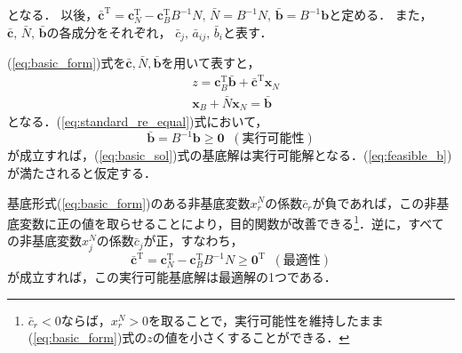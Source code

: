 \documentclass{jsreport}
\begin{document}
となる．
以後，$\bar{\bm{c}}^{\mathrm{T}} = \bm{c}_N^{\mathrm{T}} - \bm{c}_B^{\mathrm{T}}B^{-1}N, \, \bar{N} = B^{-1}N, \, \bar{\bm{b}} = B^{-1}\bm{b}$と定める．
また，$\bar{\bm{c}}, \, \bar{N}, \, \bar{\bm{b}}$の各成分をそれぞれ，
$\bar{c}_{j}, \, \bar{a}_{ij}, \, \bar{b}_i$と表す．

(\ref{eq:basic_form})式を$\bar{\bm{c}}, \bar{N}, \bar{\bm{b}}$を用いて表すと，
\begin{align}\label{eq:basic_form_re}
  &z = \bm{c}_B^{\mathrm{T}}\bar{\bm{b}} + \bar{\bm{c}}^{\mathrm{T}}\bm{x}_N \nonumber \\
  &\bm{x}_B + \bar{N}\bm{x}_N = \bar{\bm{b}}
\end{align}
となる．(\ref{eq:standard_re_equal})式において，
\begin{equation}\label{eq:feasible_b}
  \bar{\bm{b}} = B^{-1}\bm{b} \geq \bm{0} \; \; (実行可能性)
\end{equation}
が成立すれば，(\ref{eq:basic_sol})式の基底解は実行可能解となる．(\ref{eq:feasible_b})が満たされると仮定する．

基底形式(\ref{eq:basic_form})のある非基底変数$x_r^N$の係数$\bar{c}_r$が負であれば，この非基底変数に正の値を取らせることにより，目的関数が改善できる\footnote{$\bar{c}_r < 0$ならば，$x_r^N > 0$を取ることで，実行可能性を維持したまま(\ref{eq:basic_form})式の$z$の値を小さくすることができる．}．逆に，すべての非基底変数$x_j^N$の係数$\bar{c}_j$が正，すなわち，
\begin{equation}\label{eq:opt_con}
  \bar{\bm{c}}^{\mathrm{T}} = \bm{c}_N^{\mathrm{T}} - \bm{c}_B^{\mathrm{T}}B^{-1}N \geq \bm{0}^{\mathrm{T}} \; \; (最適性)
\end{equation}
が成立すれば，この実行可能基底解は最適解の1つである．
\end{document}
